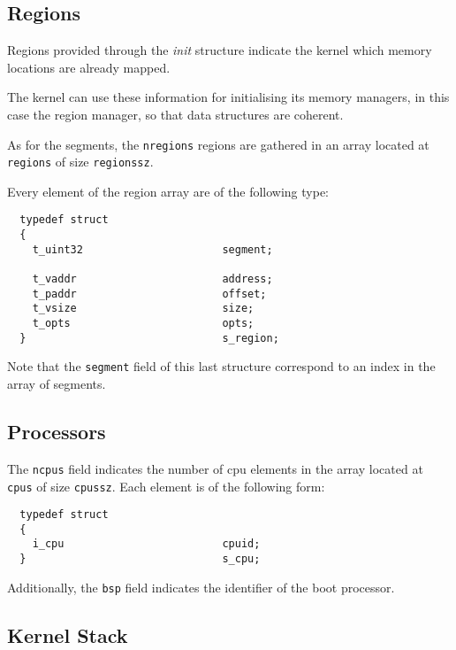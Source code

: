 
\subsection*{Regions}

Regions provided through the \textit{init} structure indicate the kernel
which memory locations are already mapped.

The kernel can use these information for initialising its memory managers,
in this case the region manager, so that data structures are coherent.

As for the segments, the \texttt{nregions} regions are gathered in an
array located at \texttt{regions} of size \texttt{regionssz}.

Every element of the region array are of the following type:

\begin{verbatim}
  typedef struct
  {
    t_uint32                      segment;

    t_vaddr                       address;
    t_paddr                       offset;
    t_vsize                       size;
    t_opts                        opts;
  }                               s_region;
\end{verbatim}

Note that the \texttt{segment} field of this last structure correspond to
an index in the array of segments.


\subsection*{Processors}

The \texttt{ncpus} field indicates the number of cpu elements in the array
located at \texttt{cpus} of size \texttt{cpussz}. Each element is of the
following form:

\begin{verbatim}
  typedef struct
  {
    i_cpu                         cpuid;
  }                               s_cpu;
\end{verbatim}

Additionally, the \texttt{bsp} field indicates the identifier of the boot
processor.


\subsection*{Kernel Stack}

